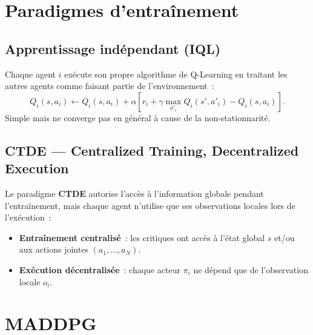 \section{Paradigmes d'entra\^inement}

\subsection{Apprentissage ind\'ependant (IQL)}

\begin{definition}
Chaque agent $i$ ex\'ecute son propre algorithme de Q-Learning en traitant les
autres agents comme faisant partie de l'environnement~:
\[
    Q_i(s, a_i) \leftarrow Q_i(s, a_i) + \alpha\left[
    r_i + \gamma \max_{a'_i} Q_i(s', a'_i) - Q_i(s, a_i)\right].
\]
Simple mais ne converge pas en g\'en\'eral \`a cause de la non-stationnarit\'e.
\end{definition}

\subsection{CTDE --- Centralized Training, Decentralized Execution}

\begin{definition}[CTDE]
Le paradigme \textbf{CTDE} autorise l'acc\`es \`a l'information globale pendant
l'entra\^inement, mais chaque agent n'utilise que ses observations locales lors
de l'ex\'ecution~:
\begin{itemize}
    \item \textbf{Entra\^inement centralis\'e}~: les critiques ont acc\`es \`a
    l'\'etat global $s$ et/ou aux actions jointes $(a_1, \ldots, a_N)$.
    \item \textbf{Ex\'ecution d\'ecentralis\'ee}~: chaque acteur $\pi_i$ ne
    d\'epend que de l'observation locale $o_i$.
\end{itemize}
\end{definition}

\section{MADDPG}


